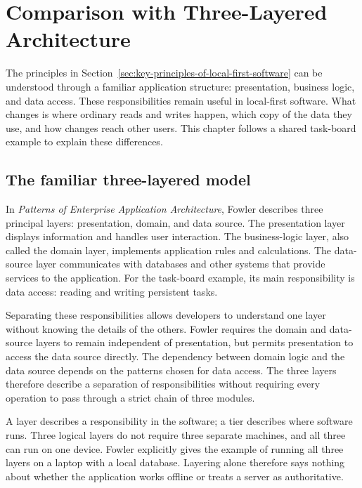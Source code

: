 \section{Comparison with Three-Layered Architecture}
\label{sec:comparison-with-three-layered-architecture}

The principles in Section~\ref{sec:key-principles-of-local-first-software} can be understood through a familiar application structure: presentation, business logic, and data access.
These responsibilities remain useful in local-first software.
What changes is where ordinary reads and writes happen, which copy of the data they use, and how changes reach other users.
This chapter follows a shared task-board example to explain these differences.

\subsection{The familiar three-layered model}

In \emph{Patterns of Enterprise Application Architecture}, Fowler describes three principal layers: presentation, domain, and data source.
The presentation layer displays information and handles user interaction.
The business-logic layer, also called the domain layer, implements application rules and calculations.
The data-source layer communicates with databases and other systems that provide services to the application.
For the task-board example, its main responsibility is data access: reading and writing persistent tasks.
\parencite[19--20]{patterns-of-enterprise-application-architecture}

Separating these responsibilities allows developers to understand one layer without knowing the details of the others.
Fowler requires the domain and data-source layers to remain independent of presentation, but permits presentation to access the data source directly.
The dependency between domain logic and the data source depends on the patterns chosen for data access.
The three layers therefore describe a separation of responsibilities without requiring every operation to pass through a strict chain of three modules.
\parencite[17, 20--22]{patterns-of-enterprise-application-architecture}

A layer describes a responsibility in the software; a tier describes where software runs.
Three logical layers do not require three separate machines, and all three can run on one device.
Fowler explicitly gives the example of running all three layers on a laptop with a local database.
\parencite[19]{patterns-of-enterprise-application-architecture}
Layering alone therefore says nothing about whether the application works offline or treats a server as authoritative.

